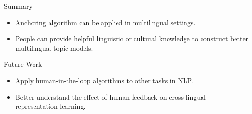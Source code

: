 \begin{frame}{Summary}
\begin{itemize}
\item Anchoring algorithm can be applied in multilingual settings.
\item People can provide helpful linguistic or cultural knowledge to construct better multilingual topic models.
\end{itemize}
\end{frame}

\begin{frame}{Future Work}
\begin{itemize}
    \item Apply human-in-the-loop algorithms to other tasks in NLP.  
    \item Better understand the effect of human feedback on cross-lingual representation learning.
\end{itemize}
\end{frame}